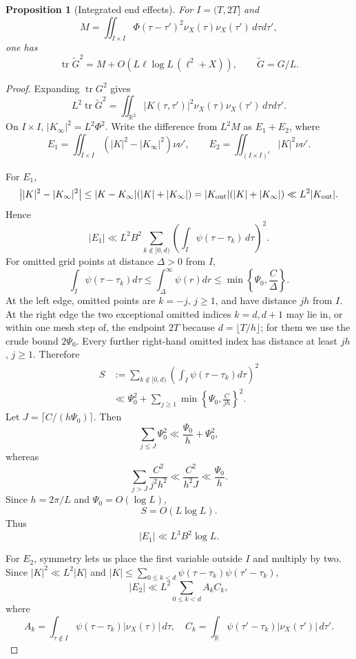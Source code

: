 \documentclass[11pt]{article}
\newtheorem{proposition}[theorem]{Proposition}
\DeclareMathOperator{\tr}{tr}
\newcommand{\R}{\mathbb R}
\begin{document}
\begin{proposition}[Integrated end effects]\label{aiii:prop:end}
For $I=(T,2T]$ and
\[
 M=\iint_{I\times I}
 \Phi(\tau-\tau')^2\nu_X(\tau)\nu_X(\tau')\,d\tau d\tau',
\]
one has
\begin{equation}\label{aiii:eq:end-final}
 \tr\widetilde G^2
 =
 M+
 O\!\left(
 L\ell\log L\,(\ell^2+X)
 \right),
 \qquad \widetilde G=G/L.
\end{equation}
\end{proposition}

\begin{proof}
Expanding $\tr G^2$ gives
\[
 L^2\tr\widetilde G^2
 =
 \iint_{\R^2}|K(\tau,\tau')|^2
 \nu_X(\tau)\nu_X(\tau')\,d\tau d\tau'.
\]
On $I\times I$, $|K_\infty|^2=L^2\Phi^2$.  Write the difference from
$L^2M$ as $E_1+E_2$, where
\[
 E_1=
 \iint_{I\times I}(|K|^2-|K_\infty|^2)\nu\nu',
\qquad
 E_2=
 \iint_{(I\times I)^c}|K|^2\nu\nu'.
\]

For $E_1$,
\[
 \bigl||K|^2-|K_\infty|^2\bigr|
 \le |K-K_\infty|(|K|+|K_\infty|)
 =|K_{\rm out}|(|K|+|K_\infty|)
 \ll L^2|K_{\rm out}|.
\]
Hence
\[
 |E_1|
 \ll
 L^2B^2
 \sum_{k\notin[0,d)}
 \left(\int_I\psi(\tau-\tau_k)\,d\tau\right)^2.
\]
For omitted grid points at distance $\Delta>0$ from $I$,
\[
 \int_I\psi(\tau-\tau_k)d\tau
 \le\int_\Delta^\infty\psi(r)dr
 \le\min\left\{\Psi_0,\frac{C}{\Delta}\right\}.
\]
At the left edge, omitted points are $k=-j$, $j\ge1$, and have
distance $jh$ from $I$.  At the right edge the two exceptional omitted
indices $k=d,d+1$ may lie in, or within one mesh step of, the endpoint
$2T$ because $d=\lfloor T/h\rfloor$; for them we use the crude bound
$2\Psi_0$.  Every further right-hand omitted index has distance at least
$jh$, $j\ge1$.  Therefore
\begin{align*}
 S&:=
 \sum_{k\notin[0,d)}
 \left(\int_I\psi(\tau-\tau_k)d\tau\right)^2\\
 &\ll
 \Psi_0^2+
 \sum_{j\ge1}
 \min\left\{\Psi_0,\frac{C}{jh}\right\}^2.
\end{align*}
Let $J=\lceil C/(h\Psi_0)\rceil$.  Then
\[
 \sum_{j\le J}\Psi_0^2
 \ll\frac{\Psi_0}{h}+\Psi_0^2,
\]
whereas
\[
 \sum_{j>J}\frac{C^2}{j^2h^2}
 \ll\frac{C^2}{h^2J}
 \ll\frac{\Psi_0}{h}.
\]
Since $h=2\pi/L$ and $\Psi_0=O(\log L)$,
\[
 S=O(L\log L).
\]
Thus
\begin{equation}\label{aiii:eq:E1final}
 |E_1|\ll L^3B^2\log L.
\end{equation}

For $E_2$, symmetry lets us place the first variable outside $I$ and multiply
by two.  Since $|K|^2\ll L^2|K|$ and
$|K|\le\sum_{0\le k<d}\psi(\tau-\tau_k)\psi(\tau'-\tau_k)$,
\[
 |E_2|
 \ll
 L^2\sum_{0\le k<d}A_kC_k,
\]
where
\[
 A_k=\int_{\tau\notin I}\psi(\tau-\tau_k)|\nu_X(\tau)|\,d\tau,
\quad
 C_k=\int_{\R}\psi(\tau'-\tau_k)|\nu_X(\tau')|\,d\tau'.
\]


\end{proof}
\end{document}

